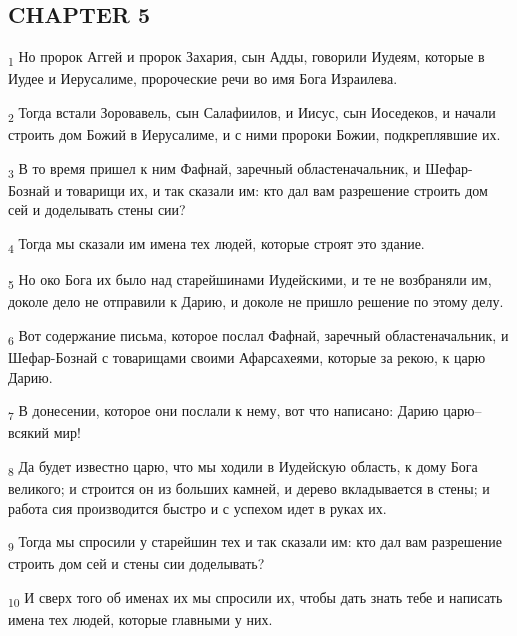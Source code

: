 \subsection{CHAPTER 5}
\begin{tcolorbox}
\textsubscript{1} Но пророк Аггей и пророк Захария, сын Адды, говорили Иудеям, которые в Иудее и Иерусалиме, пророческие речи во имя Бога Израилева.
\end{tcolorbox}
\begin{tcolorbox}
\textsubscript{2} Тогда встали Зоровавель, сын Салафиилов, и Иисус, сын Иоседеков, и начали строить дом Божий в Иерусалиме, и с ними пророки Божии, подкреплявшие их.
\end{tcolorbox}
\begin{tcolorbox}
\textsubscript{3} В то время пришел к ним Фафнай, заречный областеначальник, и Шефар-Бознай и товарищи их, и так сказали им: кто дал вам разрешение строить дом сей и доделывать стены сии?
\end{tcolorbox}
\begin{tcolorbox}
\textsubscript{4} Тогда мы сказали им имена тех людей, которые строят это здание.
\end{tcolorbox}
\begin{tcolorbox}
\textsubscript{5} Но око Бога их было над старейшинами Иудейскими, и те не возбраняли им, доколе дело не отправили к Дарию, и доколе не пришло решение по этому делу.
\end{tcolorbox}
\begin{tcolorbox}
\textsubscript{6} Вот содержание письма, которое послал Фафнай, заречный областеначальник, и Шефар-Бознай с товарищами своими Афарсахеями, которые за рекою, к царю Дарию.
\end{tcolorbox}
\begin{tcolorbox}
\textsubscript{7} В донесении, которое они послали к нему, вот что написано: Дарию царю--всякий мир!
\end{tcolorbox}
\begin{tcolorbox}
\textsubscript{8} Да будет известно царю, что мы ходили в Иудейскую область, к дому Бога великого; и строится он из больших камней, и дерево вкладывается в стены; и работа сия производится быстро и с успехом идет в руках их.
\end{tcolorbox}
\begin{tcolorbox}
\textsubscript{9} Тогда мы спросили у старейшин тех и так сказали им: кто дал вам разрешение строить дом сей и стены сии доделывать?
\end{tcolorbox}
\begin{tcolorbox}
\textsubscript{10} И сверх того об именах их мы спросили их, чтобы дать знать тебе и написать имена тех людей, которые главными у них.
\end{tcolorbox}

